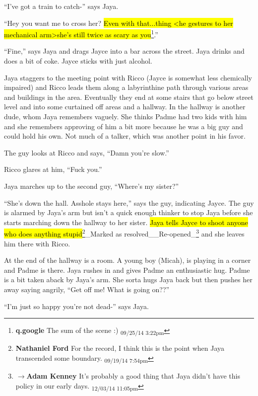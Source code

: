 ``I've got a train to catch-'' says Jaya.

``Hey you want me to cross her?  \hl{Even with that...thing \textless he gestures to her mechanical arm\textgreater  she's still twice as scary as you}\footnote{\textbf{q.google }The sum of the scene :) \textsubscript{09/25/14 3:22pm}}.''

``Fine,'' says Jaya and drags Jayce into a bar across the street.  Jaya drinks and does a bit of coke.  Jayce sticks with just alcohol.



Jaya staggers to the meeting point with Ricco (Jayce is somewhat less chemically impaired) and Ricco leads them along a labyrinthine path through various areas and buildings in the area.  Eventually they end at some stairs that go below street level and into some curtained off areas and a hallway.  In the hallway is another dude, whom Jaya remembers vaguely.  She thinks Padme had two kids with him and she remembers approving of him a bit more because he was a big guy and could hold his own. Not much of a talker, which was another point in his favor.

The guy looks at Ricco and says, ``Damn you're slow.''

Ricco glares at him, ``Fuck you.''

Jaya marches up to the second guy, ``Where's my sister?''

``She's down the hall.  Asshole stays here,'' says the guy, indicating Jayce.  The guy is alarmed by Jaya's arm but isn't a quick enough thinker to stop Jaya before she starts marching down the hallway to her sister.  \hl{Jaya tells Jayce to shoot anyone who does anything stupid}\footnote{\textbf{Nathaniel Ford }For the record, I think this is the point when Jaya transcended some boundary. \textsubscript{09/19/14 7:54pm}}\_Marked as resolved\_\_Re-opened\_\footnote{$\rightarrow$\textbf{Adam Kenney }It's probably a good thing that Jaya didn't have this policy in our early days. \textsubscript{12/03/14 11:05pm}} and she leaves him there with Ricco.



At the end of the hallway is a room.  A young boy (Micah), is playing in a corner and Padme is there.  Jaya rushes in and gives Padme an enthusiastic hug.  Padme is a bit taken aback by Jaya's arm.  She sorta hugs Jaya back but then pushes her away saying angrily, ``Get off me!  What is going on??''

``I'm just so happy you're not dead-'' says Jaya.

